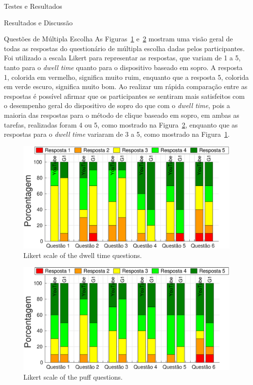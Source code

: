 \begin{chapter}{Testes e Resultados}
\begin{section}{Resultados e Discussão}
\begin{subsection}{Questões de Múltipla Escolha}
As Figuras~\ref{fig:DwellQuestions} e~\ref{fig:PuffQuestions} mostram uma visão
geral de todas as respostas do questionário de múltipla escolha dadas pelos
participantes. Foi utilizado a escala Likert para representar as respostas, que
variam de 1 a 5, tanto para o \textit{dwell time} quanto para o dispositivo
baseado em sopro.  A resposta 1, colorida em vermelho, significa muito ruim,
enquanto que a resposta 5, colorida em verde escuro, significa muito bom. Ao
realizar um rápida comparação entre as respostas é possível afirmar que os
participantes se sentiram mais satisfeitos com o desempenho geral do dispositivo
de sopro do que com o \textit{dwell time}, pois a maioria das respostas
para o método de clique baseado em sopro, em ambas as tarefas, realizadas foram 4
ou 5, como mostrado na Figura~\ref{fig:PuffQuestions}, enquanto que as respostas
para o \textit{dwell time} variaram de 3 a 5, como mostrado na
Figura~\ref{fig:DwellQuestions}.  

\begin{figure}[!h]
	\centering
	\begin{minipage}[c]{\textwidth}
	\centering
	\includegraphics[width=0.9\linewidth]{fig/DwellQuestions}
	\caption{Likert scale of the dwell time questions.} 
	\label{fig:DwellQuestions}
	\end{minipage}
\end{figure}

\begin{figure}[!h]
	\centering
	\begin{minipage}[c]{\textwidth}
	\centering
	\includegraphics[width=0.9\linewidth]{fig/PuffQuestions}
	\caption{Likert scale of the puff questions.}
	\label{fig:PuffQuestions}
	\end{minipage}
\end{figure}




\end{subsection}
\end{section}
\end{chapter}
